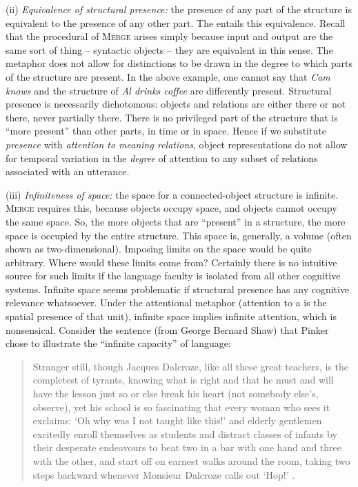 (ii) \textit{Equivalence of structural presence:} the presence of any part of the structure is equivalent to the presence of any other part. The  entails this equivalence. Recall that the procedural  of \textsc{Merge} arises simply because input and output are the same sort of thing -- syntactic objects -- they are equivalent in this sense. The metaphor does not allow for distinctions to be drawn in the degree to which parts of the structure are present. In the above example, one cannot say that \textit{Cam knows} and the structure of \textit{Al drinks coffee} are differently present. Structural presence is necessarily dichotomous: objects and relations are either there or not there, never partially there. There is no privileged part of the structure that is “more present” than other parts, in time or in space. Hence if we substitute \textit{presence} with \textit{attention to meaning relations}, object representations do not allow for temporal variation in the \textit{degree} of attention to any subset of relations associated with an utterance. 

(iii) \textit{Infiniteness of space:} the space for a connected-object structure is infinite. \textsc{Merge} requires this, because objects occupy space, and objects cannot occupy the same space. So, the more objects that are “present” in a structure, the more space is occupied by the entire structure. This space is, generally, a volume (often shown as two-di\-men\-sional). Imposing limits on the space would be quite arbitrary. Where would these limits come from? Certainly there is no intuitive source for such limits if the language faculty is isolated from all other cognitive systems. Infinite space seems problematic if structural presence has any cognitive relevance whatsoever. Under the attentional metaphor (attention to a  is the spatial presence of that unit), infinite space implies infinite attention, which is nonsensical. Consider the sentence (from George Bernard Shaw) that Pinker chose to illustrate the “infinite capacity” of language:

\begin{quote}
Stranger still, though Jacques Dalcroze, like all these great teachers, is the completest of tyrants, knowing what is right and that he must and will have the lesson just so or else break his heart (not somebody else’s, observe), yet his school is so fascinating that every woman who sees it exclaims: ‘Oh why was I not taught like this!’ and elderly gentlemen excitedly enroll themselves as students and distract classes of infants by their desperate endeavours to beat two in a bar with one hand and three with the other, and start off on earnest walks around the room, taking two steps backward whenever Monsieur Dalcroze calls out ‘Hop!’ \citep{Pinker2003}.
\end{quote}

